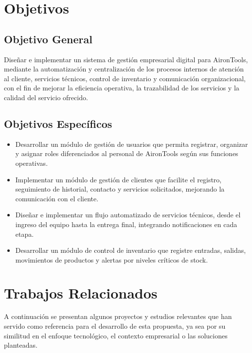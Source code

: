 \section{Objetivos}

\subsection{Objetivo General}
Diseñar e implementar un sistema de gestión empresarial digital para AironTools, mediante la automatización y centralización de los procesos internos de atención al cliente, servicios técnicos, control de inventario y comunicación organizacional, con el fin de mejorar la eficiencia operativa, la trazabilidad de los servicios y la calidad del servicio ofrecido.

\subsection{Objetivos Específicos}

\begin{itemize}
	\item Desarrollar un módulo de gestión de usuarios que permita registrar, organizar y asignar roles diferenciados al personal de AironTools según sus funciones operativas.

	\item Implementar un módulo de gestión de clientes que facilite el registro, seguimiento de historial, contacto y servicios solicitados, mejorando la comunicación con el cliente.

	\item Diseñar e implementar un flujo automatizado de servicios técnicos, desde el ingreso del equipo hasta la entrega final, integrando notificaciones en cada etapa.

	\item Desarrollar un módulo de control de inventario que registre entradas, salidas, movimientos de productos y alertas por niveles críticos de stock.
\end{itemize}

\section{Trabajos Relacionados}

A continuación se presentan algunos proyectos y estudios relevantes que han servido como referencia para el desarrollo de esta propuesta, ya sea por su similitud en el enfoque tecnológico, el contexto empresarial o las soluciones planteadas.


